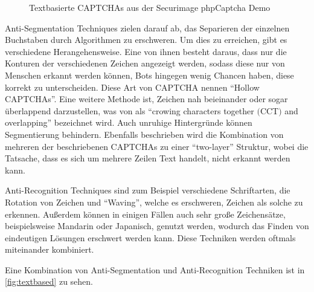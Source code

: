 \begin{figure}[h!]
    \centering
    \qquad
    \caption{Textbasierte CAPTCHAs aus der Securimage phpCaptcha Demo}   
    \label{fig:textbased}
\end{figure}

Anti-Segmentation Techniques zielen darauf ab, das Separieren der einzelnen Buchstaben durch Algorithmen zu erschweren. 
Um dies zu erreichen, gibt es verschiedene Herangehensweise.
Eine von ihnen besteht daraus, dass nur die Konturen der verschiedenen Zeichen angezeigt werden, sodass diese nur von Menschen erkannt werden können,
Bots hingegen wenig Chancen haben, diese korrekt zu unterscheiden. Diese Art von CAPTCHA nennen \citeauthor{surveyofresearch} ``Hollow CAPTCHAs''. %
Eine weitere Methode ist, Zeichen nah beieinander oder sogar überlappend darzustellen, 
was von \citeauthor{surveyofresearch} als ``crowing characters together $($CCT$)$ and overlapping'' bezeichnet wird.
Auch unruhige Hintergründe können Segmentierung behindern.
Ebenfalls beschrieben wird die Kombination von mehreren der beschriebenen CAPTCHAs zu einer ``two-layer'' Struktur,
wobei die Tatsache, dass es sich um mehrere Zeilen Text handelt, nicht erkannt werden kann. \cite[p.76]{surveyofresearch}

Anti-Recognition Techniques sind zum Beispiel verschiedene Schriftarten, die Rotation von Zeichen und ``Waving'', 
welche es erschweren, Zeichen als solche zu erkennen. 
Außerdem können in einigen Fällen auch sehr große Zeichensätze, beispielsweise Mandarin oder Japanisch, genutzt werden, 
wodurch das Finden von eindeutigen Lösungen erschwert werden kann.
Diese Techniken werden oftmals miteinander kombiniert.
\cite[p.77]{surveyofresearch}

Eine Kombination von Anti-Segmentation und Anti-Recognition Techniken ist in \autoref{fig:textbased} zu sehen.

